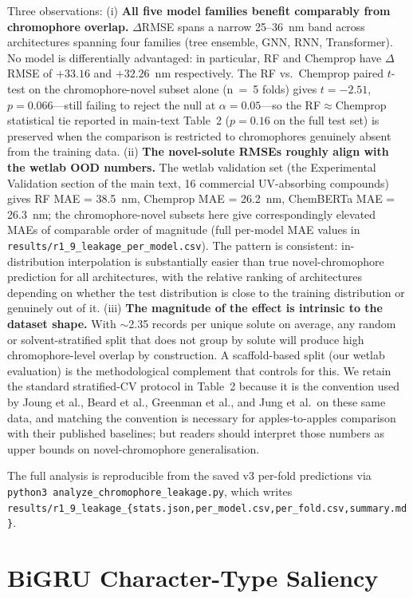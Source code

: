 \documentclass[journal=jcisd8,manuscript=suppinfo]{achemso}
\begin{document}
Three observations:
(i) \textbf{All five model families benefit comparably from chromophore overlap.} $\Delta$RMSE spans a narrow 25--36~nm band across architectures spanning four families (tree ensemble, GNN, RNN, Transformer). No model is differentially advantaged: in particular, RF and Chemprop have $\Delta$RMSE of $+33.16$ and $+32.26$~nm respectively. The RF vs.\ Chemprop paired $t$-test on the chromophore-novel subset alone (n~=~5 folds) gives $t = -2.51$, $p = 0.066$---still failing to reject the null at $\alpha = 0.05$---so the RF$\approx$Chemprop statistical tie reported in main-text Table~2 ($p = 0.16$ on the full test set) is preserved when the comparison is restricted to chromophores genuinely absent from the training data.
(ii) \textbf{The novel-solute RMSEs roughly align with the wetlab OOD numbers.} The wetlab validation set (the Experimental Validation section of the main text, 16 commercial UV-absorbing compounds) gives RF MAE = 38.5~nm, Chemprop MAE = 26.2~nm, ChemBERTa MAE = 26.3~nm; the chromophore-novel subsets here give correspondingly elevated MAEs of comparable order of magnitude (full per-model MAE values in \texttt{results/r1\_9\_leakage\_per\_model.csv}). The pattern is consistent: in-distribution interpolation is substantially easier than true novel-chromophore prediction for all architectures, with the relative ranking of architectures depending on whether the test distribution is close to the training distribution or genuinely out of it.
(iii) \textbf{The magnitude of the effect is intrinsic to the dataset shape.} With $\sim$2.35 records per unique solute on average, any random or solvent-stratified split that does not group by solute will produce high chromophore-level overlap by construction. A scaffold-based split (our wetlab evaluation) is the methodological complement that controls for this. We retain the standard stratified-CV protocol in Table~2 because it is the convention used by Joung et al., Beard et al., Greenman et al., and Jung et al.\ on these same data, and matching the convention is necessary for apples-to-apples comparison with their published baselines; but readers should interpret those numbers as upper bounds on novel-chromophore generalisation.

The full analysis is reproducible from the saved v3 per-fold predictions via \texttt{python3 analyze\_chromophore\_leakage.py}, which writes \texttt{results/r1\_9\_leakage\_\{stats.json,per\_model.csv,per\_fold.csv,summary.md\}}.


\section{BiGRU Character-Type Saliency}
\label{sec:chartype_saliency}
\end{document}
